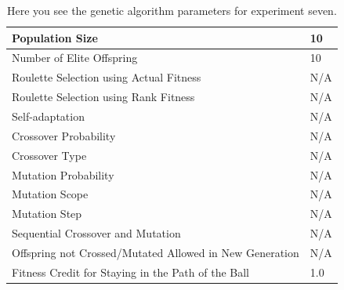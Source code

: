 \documentclass[a4paper,10pt]{article}
\begin{document}
\begin{table}[H]
\centering
\footnotesize
\begin{tabular}{ |>{\columncolor[gray]{0.8}} l | l| }
\hline
Population Size                                                      & 10                                                                       \\ \hline
Number of Elite Offspring                                            & 10                                                                       \\ \hline
Roulette Selection using Actual Fitness                              & N/A                                                                      \\ \hline
Roulette Selection using Rank Fitness                                & N/A                                                                      \\ \hline
Self-adaptation                                                      & N/A                                                                      \\ \hline
Crossover Probability                                                & N/A                                                                      \\ \hline
Crossover Type                                                       & N/A                                                                      \\ \hline
Mutation Probability                                                 & N/A                                                                      \\ \hline
Mutation Scope                                                       & N/A                                                                      \\ \hline
Mutation Step                                                        & N/A                                                                      \\ \hline
Sequential Crossover and Mutation                                    & N/A                                                       	              \\ \hline
Offspring not Crossed/Mutated Allowed in New Generation              & N/A                                                      	              \\ \hline
Fitness Credit for Staying in the Path of the Ball                   & 1.0                                                      	              \\ \hline
\end{tabular}
\caption{Here you see the genetic algorithm parameters for experiment seven.}
\label{tab:exp7}
\end{table}
\end{document}

